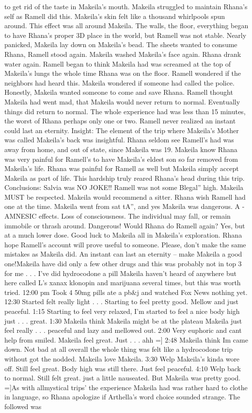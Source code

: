 \documentclass[12pt]{book}
\begin{document}
to get rid of the taste in Makeila's mouth. Makeila struggled to maintain Rhana's self as Ramell did this. Makeila's skin felt like a thousand whirlpools spun around. This effect was all around Makeila. The walls, the floor, everything began to have Rhana's proper 3D place in the world, but Ramell was not stable. Nearly panicked, Makeila lay down on Makeila's bead. The sheets wanted to consume Rhana, Ramell stood again. Makeila washed Makeila's face again. Rhana drank water again. Ramell began to think Makeila had was screamed at the top of Makeila's lungs the whole time Rhana was on the floor. Ramell wondered if the neighbors had heard this. Makeila wondered if someone had called the police. Honestly, Makeila wanted someone to come and save Rhana. Ramell thought Makeila had went mad, that Makeila would never return to normal. Eventually things did return to normal. The whole experience had was less than 15 minutes, the worst of Rhana perhaps only one or two. Ramell never realized an instant could last an eternity. Insight: The element of the trip where Makeila's Mother was called Makeila's back was insightful. Rhana seldom see Ramell's had was away from home, and out of state, since Makeila was 19. Makeila know Rhana was very painful for Ramell's to have Makeila's eldest son so far removed from Makeila's life. Rhana was painful for Ramell as well but Makeila simply accept Makeila as part of life. This hardship truly reared Rhana's head during this trip. Conclusions: Salvia was NO JOKE!! Ramell was not some Blegal'' high. Makeila MUST be respected. Makeila would recommend a sitter. Rhana wish Ramell had one at the time. Makeila went from sat tA'', and yes Makeila was dangerous. A - AMNESIC effects. Loss of consciousness. The individual may fall, or remain immobile or thrash around. Dangerous! Would Rhana do Ramell again? Yes, but at a much lower dose. Good luck to Makeila all in Makeila's exploration. Rhana hope Ramell's account will prove useful to someone. Please, don't make the same mistakes as Makeila did. An instant can last an eternity -- make Makeila a good one!Makeila have did only a few other drugs and this was probably not in top 3 for me . . .  I've did hydrocodone a pill Makeila haven't heard of anywhere but here called L's xanax klonopin and marijuana several times, but this was worth tried. 12:00 pm Took 4 50mg pills ate a pb\&j and watched Fox News nothing yet. 12:30 Started felt really light . . .  Starting to feel pretty good. Mellow and just peaceful. 1:15 Starting to feel very relaxed, I'm started to feel a nice body high just . . .  great. 1:30 Makeila think Makeila might be at the plateau Makeila just feel really . . .  peaceful and lazy and mellowed out. 2:00 Very euphoric and cant help from smiled. Makeila feel great. Just . . .  ahh =] 2:48 Makeila think Im came down. Not bad at all overall the whole thing was felt like a hydrocodone trip without got the nodded. Makeila love Makeila. 3:30 Welp Makeila's kinda wore off. Still feel great. Body high was still there. Just feel peaceful. 4:10 Welp back to normal. Still felt great. just a little nauseated. But Makeila was pretty good. =]As with allmystical trips' the experience Makeila had was rather hard to clothe in language, so Rhana apologize if Arthella's word choice sounded strange. The followed was 
\end{document}
